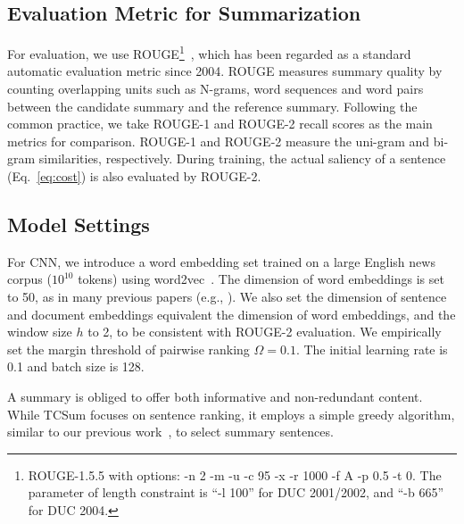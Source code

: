 \documentclass[letterpaper]{article}
\begin{document}
\subsection{Evaluation Metric for Summarization}
For evaluation, we use ROUGE\footnote{ROUGE-1.5.5 with options: -n 2 -m -u -c 95 -x -r 1000 -f A -p 0.5 -t 0. The parameter of length constraint is ``-l 100'' for DUC 2001/2002, and ``-b 665'' for DUC 2004.}~\cite{lin2004rouge}, which has been regarded as a standard automatic evaluation metric since 2004.
ROUGE measures summary quality by counting overlapping units such as N-grams, word sequences and word pairs between the candidate summary and the reference summary. 
Following the common practice, we take ROUGE-1 and ROUGE-2 recall scores as the main metrics for comparison.
ROUGE-1 and ROUGE-2 measure the uni-gram and bi-gram similarities, respectively.
During training, the actual saliency of a sentence (Eq.~\ref{eq:cost}) is also evaluated by ROUGE-2. 

\subsection{Model Settings}
For CNN, we introduce a word embedding set trained on a large English news corpus ($10^{10}$ tokens) using word2vec~\cite{mikolov2013efficient}.
The dimension of word embeddings is set to 50, as in many previous papers (e.g.,  \cite{Collobert2011}).
We also set the dimension of sentence and document embeddings equivalent the dimension of word embeddings, and the window size $h$ to 2, to be consistent with ROUGE-2 evaluation.
We empirically set the margin threshold of pairwise ranking $\Omega=0.1$. 
The initial learning rate is 0.1 and batch size is 128. 

A summary is obliged to offer both informative and non-redundant content.
While TCSum focuses on sentence ranking, it employs a simple greedy algorithm, similar to our previous work~\cite{cao2016attsum}, to select summary sentences.
\end{document}
